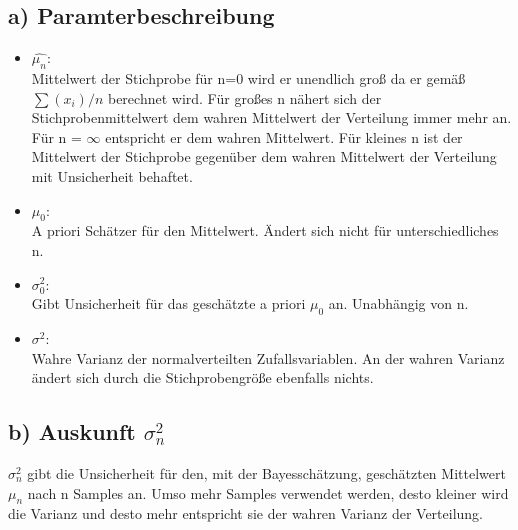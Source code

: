 \documentclass{scrartcl}
\begin{document}
\subsection*{a) Paramterbeschreibung}
\begin{itemize}
	\item $\hat{\mu_n}$:\\
	Mittelwert der Stichprobe für n=0 wird er unendlich groß da er gemäß $\sum(x_i) /n$ berechnet wird. Für großes n nähert sich der Stichprobenmittelwert dem wahren Mittelwert der Verteilung immer mehr an. Für n = $\infty$ entspricht er dem wahren Mittelwert. Für kleines n ist der Mittelwert der Stichprobe gegenüber dem wahren Mittelwert der Verteilung mit Unsicherheit behaftet.
	\item $\mu_0$:\\
	A priori Schätzer für den Mittelwert. Ändert sich nicht für unterschiedliches n. 
	\item $\sigma^2_0$:\\
	Gibt Unsicherheit für das geschätzte a priori $\mu_0$ an. Unabhängig von n.
	\item $\sigma^2$:\\
	Wahre Varianz der normalverteilten Zufallsvariablen. An der wahren Varianz ändert sich durch die Stichprobengröße ebenfalls nichts.
\end{itemize}

\subsection*{b) Auskunft $\sigma^2_n$}
$\sigma^2_n$ gibt die Unsicherheit für den, mit der Bayesschätzung, geschätzten Mittelwert $\mu_n$ nach n Samples an. Umso mehr Samples verwendet werden, desto kleiner wird die Varianz und desto mehr entspricht sie der wahren Varianz der Verteilung.
\end{document}
